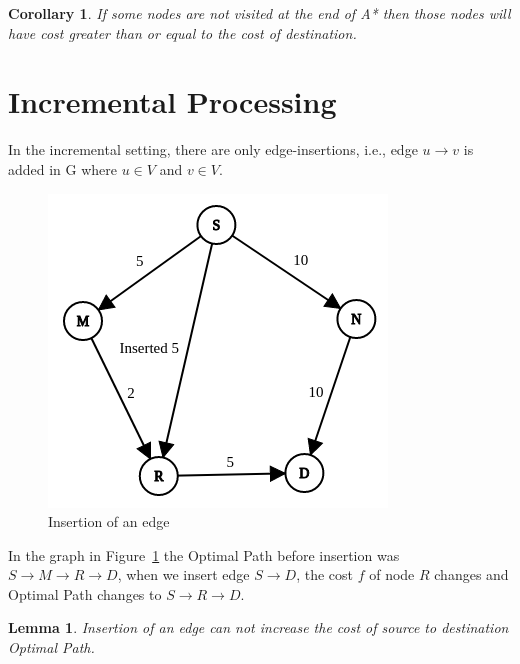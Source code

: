 \documentclass[a4paper]{article}
\newtheorem{corollary}{Corollary}[theorem]
\newtheorem{lemma}[theorem]{Lemma}
\begin{document}
\begin{corollary}\label{corollary:Astar property}
If some nodes are not visited at the end of A* then those nodes will have cost greater than or equal to the cost of destination. 
\end{corollary}


\section{Incremental Processing}\label{sec:incremental}
In the incremental setting, there are only edge-insertions, i.e., edge $u \rightarrow v $ is added in G where $u\in V $ and $v \in V$.
\begin{figure}[h!]
    \centering
    \includegraphics[scale=0.4]{img/insert1.png}
    \caption{Insertion of an edge}
    \label{fig:insert_graph}
\end{figure}
In the graph in Figure~\ref{fig:insert_graph} the Optimal Path before insertion was $S \rightarrow M \rightarrow R \rightarrow D$, when we insert edge $S \rightarrow D$, the cost $f$ of node $R$ changes and Optimal Path changes to $S \rightarrow R \rightarrow D$.


\begin{lemma}\label{lemma:insertion_property1}
Insertion of an edge can not increase the cost of source to destination Optimal Path.
\end{lemma}
\end{document}
